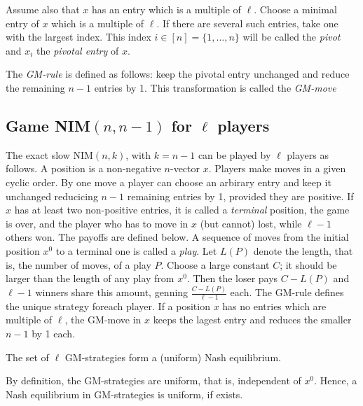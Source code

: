 Assume also that  $x$  has an entry which is a multiple of $\ell$. 
Choose a minimal entry of $x$  
which is a multiple of $\ell$. 
If there are several such entries,  
take one with the largest index. 
This index  $i \in [n] = \{1,\ldots,n\}$  
will be called the {\em pivot} 
and $x_i$ the {\em pivotal entry} of $x$. 

\medskip 

The {\em GM-rule} is defined as follows: 
keep the pivotal entry unchanged 
and reduce the remaining $n-1$ entries by 1.
This transformation is called the {\em GM-move} 
\subsection{Game NIM$(n,n-1)$  for $\ell$ players} 
The exact slow NIM$(n,k)$, with $k = n-1$  
can be played by $\ell$  players  %
as follows. 
A position is a non-negative $n$-vector  $x$. 
Players make moves in a given cyclic order. 
By one move a player can choose an arbirary 
entry and keep it unchanged 
reducicing $n-1$ remaining entries by 1, 
provided they are positive. 
If  $x$  has at least two non-positive entries, 
it is called a {\em terminal} position, 
the game is over, and the player 
who has to move in $x$ (but cannot) lost, 
while  $\ell-1$  others won. 
The payoffs are defined below. 
A sequence of moves 
from the initial position  $x^0$ 
to a terminal one is called a {\em play}. 
Let  $L(P)$  denote the length, 
that is, the number of moves, of a play  $P$. 
Choose a large constant $C$; 
it should be larger than the length 
of any play from  $x^0$.  
Then the loser pays $C-L(P)$ 
and $\ell-1$  winners share this amount, 
genning $\frac{C - L(P)}{\ell-1}$ each. 
The GM-rule defines the unique strategy foreach player.
If a position  $x$  has no entries which are multiple of $\ell$, 
the GM-move in $x$ keeps the lagest entry and reduces 
the smaller $n-1$ by 1 each. 

\begin{conjecture}
\label{con-1} 
The set of $\ell$ GM-strategies form a (uniform) Nash equilibrium. 
\end{conjecture}

By definition, the GM-strategies are uniform, 
that is, independent of  $x^0$. 
Hence, a  Nash equilibrium in GM-strategies  
is uniform, if exists. 

